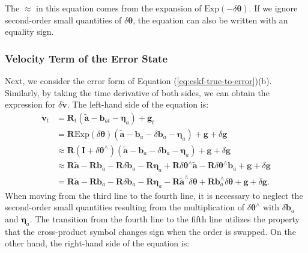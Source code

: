 The $\approx$ in this equation comes from the expansion of $\mathrm{Exp}(-\delta \boldsymbol{\theta})$. If we ignore second-order small quantities of $\delta \boldsymbol{\theta}$, the equation can also be written with an equality sign.

\subsubsection{Velocity Term of the Error State}
Next, we consider the error form of Equation (\ref{eq:eskf-true-to-error})(b). Similarly, by taking the time derivative of both sides, we can obtain the expression for $\delta \dot{\mathbf{v}}$. The left-hand side of the equation is:
\begin{equation}
	\begin{aligned}
		\dot{\mathbf{v}}_t &= \mathbf{R}_t(\tilde{\mathbf{a}} - \mathbf{b}_{at} - \boldsymbol{\eta}_a) + \mathbf{g}_t \\
		&= \mathbf{R} \mathrm{Exp}(\delta \boldsymbol{\theta}) (\tilde{\mathbf{a}} - \mathbf{b}_a - \delta \mathbf{b}_a 
		- \boldsymbol{\eta}_a ) + \mathbf{g} + \delta \mathbf{g} \\
		&\approx \mathbf{R} (\mathbf{I} + \delta \boldsymbol{\theta}^\wedge ) (\tilde{\mathbf{a}} - \mathbf{b}_a - \delta 
		\mathbf{b}_a - \boldsymbol{\eta}_a) + \mathbf{g} + \delta \mathbf{g} \\
		&\approx \mathbf{R} \tilde{\mathbf{a}} - \mathbf{R} \mathbf{b}_a - \mathbf{R} \delta \mathbf{b}_a - \mathbf{R} 
		\boldsymbol{\eta}_a + \mathbf{R} \delta \boldsymbol{\theta}^\wedge \tilde{\mathbf{a}} - \mathbf{R} \delta 
		\boldsymbol{\theta}^\wedge \mathbf{b}_a + \mathbf{g} + \delta \mathbf{g} \\
		&= \mathbf{R} \tilde{\mathbf{a}} - \mathbf{R} \mathbf{b}_a - \mathbf{R} \delta \mathbf{b}_a - \mathbf{R} 
		\boldsymbol{\eta}_a - \mathbf{R} \tilde{\mathbf{a}}^\wedge \delta \boldsymbol{\theta}  + \mathbf{R} 
		\mathbf{b}_a^\wedge  \delta\boldsymbol{\theta}  + \mathbf{g} + \delta \mathbf{g}.
	\end{aligned}
\end{equation}
When moving from the third line to the fourth line, it is necessary to neglect the second-order small quantities resulting from the multiplication of $\delta \boldsymbol{\theta}^\wedge$ with $\delta \mathbf{b}_a$ and $\boldsymbol{\eta}_a$. The transition from the fourth line to the fifth line utilizes the property that the cross-product symbol changes sign when the order is swapped. On the other hand, the right-hand side of the equation is:

